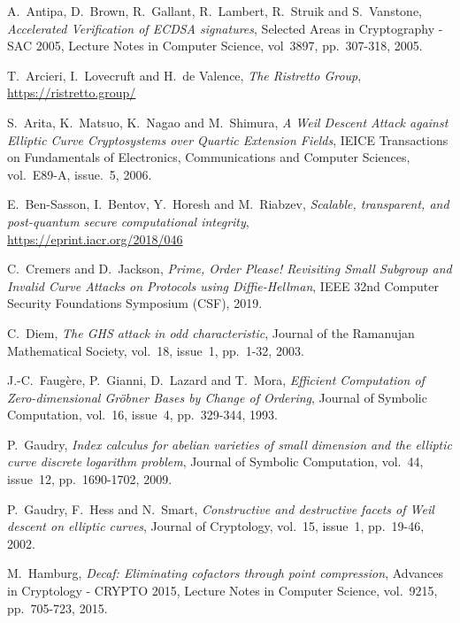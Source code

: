 \documentclass{llncs}
\begin{document}
\begin{thebibliography}{20}

A.~Antipa, D.~Brown, R.~Gallant, R.~Lambert, R.~Struik and S.~Vanstone,
\emph{Accelerated Verification of ECDSA signatures},
Selected Areas in Cryptography - SAC 2005, Lecture Notes in Computer
Science, vol~3897, pp.~307-318, 2005.

T.~Arcieri, I.~Lovecruft and H.~de Valence,
\emph{The Ristretto Group},\\
\url{https://ristretto.group/}

S.~Arita, K.~Matsuo, K.~Nagao and M.~Shimura,
\emph{A Weil Descent Attack against Elliptic Curve Cryptosystems over
Quartic Extension Fields},
IEICE Transactions on Fundamentals of Electronics, Communications and
Computer Sciences, vol.~E89-A, issue.~5, 2006.

E.~Ben-Sasson, I.~Bentov, Y.~Horesh and M.~Riabzev,
\emph{Scalable, transparent, and post-quantum secure computational integrity},\\
\url{https://eprint.iacr.org/2018/046}

C.~Cremers and D.~Jackson,
\emph{Prime, Order Please! Revisiting Small Subgroup and Invalid Curve
Attacks on Protocols using Diffie-Hellman},
IEEE 32nd Computer Security Foundations Symposium (CSF), 2019.

C.~Diem,
\emph{The GHS attack in odd characteristic},
Journal of the Ramanujan Mathematical Society, vol.~18, issue~1,
pp.~1-32, 2003.

J.-C.~Faugère, P.~Gianni, D.~Lazard and T.~Mora,
\emph{Efficient Computation of Zero-dimensional Gröbner Bases by Change
of Ordering},
Journal of Symbolic Computation, vol.~16, issue~4, pp.~329-344, 1993.

P.~Gaudry,
\emph{Index calculus for abelian varieties of small dimension and the
elliptic curve discrete logarithm problem},
Journal of Symbolic Computation, vol.~44, issue~12, pp.~1690-1702, 2009.

P.~Gaudry, F.~Hess and N.~Smart,
\emph{Constructive and destructive facets of Weil descent on elliptic curves},
Journal of Cryptology, vol.~15, issue~1, pp.~19-46, 2002.

M.~Hamburg,
\emph{Decaf: Eliminating cofactors through point compression},
Advances in Cryptology - CRYPTO 2015, Lecture Notes in Computer Science,
vol.~9215, pp.~705-723, 2015.


\end{thebibliography}
\end{document}
